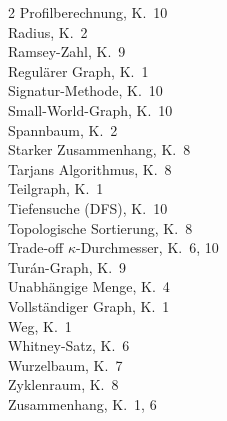 ﻿\documentclass[a4paper,12pt,openany,oneside]{book}
\theoremstyle{definition}
\theoremstyle{plain}
\theoremstyle{remark}
\begin{document}
\begin{multicols}{2}
Profilberechnung, K.~10 \\
Radius, K.~2 \\
Ramsey-Zahl, K.~9 \\
Regul\"arer Graph, K.~1 \\
Signatur-Methode, K.~10 \\
Small-World-Graph, K.~10 \\
Spannbaum, K.~2 \\
Starker Zusammenhang, K.~8 \\
Tarjans Algorithmus, K.~8 \\
Teilgraph, K.~1 \\
Tiefensuche (DFS), K.~10 \\
Topologische Sortierung, K.~8 \\
Trade-off $\kappa$-Durchmesser, K.~6, 10 \\
Tur\'an-Graph, K.~9 \\
Unabh\"angige Menge, K.~4 \\
Vollst\"andiger Graph, K.~1 \\
Weg, K.~1 \\
Whitney-Satz, K.~6 \\
Wurzelbaum, K.~7 \\
Zyklenraum, K.~8 \\
Zusammenhang, K.~1, 6 \\
\end{multicols}
\end{document}
